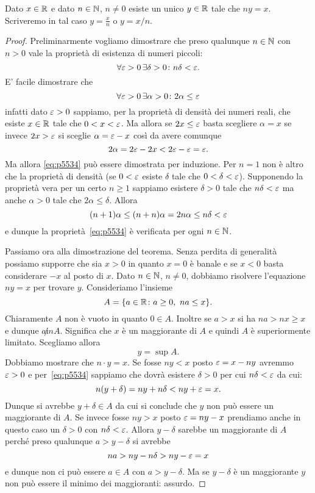 \begin{theorem}
  Dato $x\in \mathbb R$ e dato $n\in \mathbb N$, $n\neq 0$ esiste un unico $y\in \mathbb R$ 
  tale che $n y = x$. Scriveremo in tal caso $y=\frac{x}{n}$ o $y=x/n$.
\end{theorem}
\begin{proof}
  Preliminarmente vogliamo dimostrare che  
  preso qualunque $n\in \mathbb N$ con $n>0$
  vale la proprietà di esistenza di numeri piccoli:
  \begin{equation}\label{eq:p5534}
    \forall \varepsilon>0\, \exists \delta>0 \colon n\delta < \varepsilon.
  \end{equation}
  E' facile dimostrare che 
  \[
    \forall \varepsilon>0\, \exists \alpha>0 \colon 2 \alpha \le \varepsilon  
  \]
  infatti dato $\varepsilon>0$ sappiamo, per la proprietà di
  densità dei numeri reali, che esiste $x\in \mathbb R$ tale che $0<x<\varepsilon$.
  Ma allora se $2x\le \varepsilon$ basta scegliere $\alpha = x$ 
  se invece $2x>\varepsilon$ si sceglie $\alpha = \varepsilon-x$
  così da avere comunque
  \[
  2 \alpha = 2 \varepsilon - 2 x < 2\varepsilon - \varepsilon = \varepsilon.
  \]
  Ma allora \eqref{eq:p5534} può essere dimostrata per induzione.
  Per $n=1$ non è altro che la proprietà di densità (se $0<\varepsilon$ esiste $\delta$ tale 
  che $0<\delta<\varepsilon$). Supponendo la proprietà vera per un certo $n\ge 1$
  sappiamo esistere $\delta>0$ tale che $n\delta < \varepsilon$ ma anche $\alpha>0$ 
  tale che $2\alpha \le \delta$. Allora
  \[
   (n+1)\alpha \le (n+n)\alpha = 2n\alpha \le n\delta < \varepsilon
  \]
  e dunque la proprietà~\eqref{eq:p5534} è verificata per ogni $n\in \mathbb N$.

  Passiamo ora alla dimostrazione del teorema.
  Senza perdita di generalità possiamo supporre che sia $x>0$ 
  in quanto $x=0$ è banale e se $x<0$ basta considerare $-x$ al posto di $x$. 
  Dato $n\in \mathbb N$, $n\neq 0$, dobbiamo 
  risolvere l'equazione $n y = x$ per trovare $y$.
  Consideriamo l'insieme 
  \[
    A = \{a\in \mathbb R\colon a\ge 0,\ n a \le x\}.
  \]
  Chiaramente $A$ non è vuoto in quanto $0\in A$. 
  Inoltre se $a>x$ si ha $n a > n x \ge x$ e dunque $a\not in A$.
  Significa che $x$ è un maggiorante di $A$ e quindi $A$ è superiormente limitato.
  Scegliamo allora
  \[
    y = \sup A.  
  \]
  Dobbiamo mostrare che $n\cdot y = x$. 
  Se fosse $n y < x$ posto $\varepsilon = x - n y$ avremmo $\varepsilon>0$
  e per~\eqref{eq:p5534} sappiamo che dovrà esistere $\delta>0$ 
  per cui $n\delta < \varepsilon$ da cui:
  \[
      n(y+\delta) = ny + n\delta < ny + \varepsilon = x.
  \]
  Dunque si avrebbe $y+\delta \in A$ da cui si conclude che $y$ non 
  può essere un maggiorante di $A$.
  Se invece fosse $n y > x$ posto $\varepsilon = ny - x$
  prendiamo anche in questo caso un $\delta >0$ con $n\delta < \varepsilon$.
  Allora $y-\delta$ sarebbe un maggiorante di $A$ perché preso qualunque 
  $a>y-\delta$ si avrebbe
  \[
    na > ny-n\delta > ny -\varepsilon = x
  \]
  e dunque non ci può essere $a\in A$ con $a>y-\delta$. Ma se $y-\delta$ è un 
  maggiorante $y$ non può essere il minimo dei maggioranti: assurdo.
  

\end{proof}

